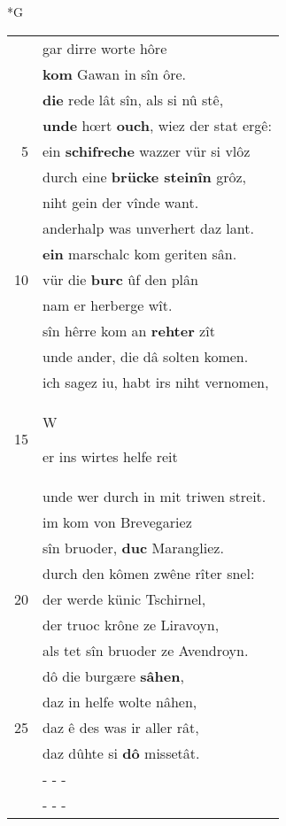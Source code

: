 \documentclass[8pt,a4paper,notitlepage]{article}
\begin{document}
\newpage
\begin{table}[ht]
\begin{minipage}[t]{0.5\linewidth}
\small
\begin{center}*G
\end{center}
\begin{tabular}{rl}
 & gar dirre worte hôre\\ 
 & \textbf{kom} Gawan in sîn ôre.\\ 
 & \textbf{die} rede lât sîn, als si nû stê,\\ 
 & \textbf{unde} hœrt \textbf{ouch}, wiez der stat ergê:\\ 
5 & ein \textbf{schifreche} wazzer vür si vlôz\\ 
 & durch eine \textbf{brücke steinîn} grôz,\\ 
 & niht gein der vînde want.\\ 
 & anderhalp was unverhert daz lant.\\ 
 & \textbf{ein} marschalc kom geriten sân.\\ 
10 & vür die \textbf{burc} ûf den plân\\ 
 & nam er herberge wît.\\ 
 & sîn hêrre kom an \textbf{rehter} zît\\ 
 & unde ander, die dâ solten komen.\\ 
 & ich sagez iu, habt irs niht vernomen,\\ 
15 & \begin{large}W\end{large}er ins wirtes helfe reit\\ 
 & unde wer durch in mit triwen streit.\\ 
 & im kom von Brevegariez\\ 
 & sîn bruoder, \textbf{duc} Marangliez.\\ 
 & durch den kômen zwêne rîter snel:\\ 
20 & der werde künic Tschirnel,\\ 
 & der truoc krône ze Liravoyn,\\ 
 & als tet sîn bruoder ze Avendroyn.\\ 
 & dô die burgære \textbf{sâhen},\\ 
 & daz in helfe wolte nâhen,\\ 
25 & daz ê des was ir aller rât,\\ 
 & daz dûhte si \textbf{dô} missetât.\\ 
 & \multicolumn{1}{l}{ - - - }\\ 
 & \multicolumn{1}{l}{ - - - }\\ 

\end{tabular}
\end{minipage}
\end{table}
\end{document}
